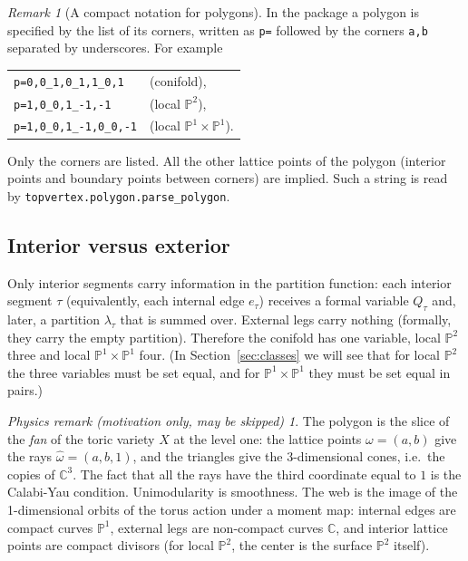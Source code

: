 \documentclass[11pt]{article}
\theoremstyle{plain}
\theoremstyle{definition}
\theoremstyle{remark}
\newtheorem{remark}[theorem]{Remark}
\newtheorem*{physrem}{Physics remark (motivation only, may be skipped)}
\newcommand{\C}{\mathbb{C}}
\newcommand{\PP}{\mathbb{P}}
\newcommand{\hatw}{\widehat{\omega}}
\begin{document}
\begin{remark}[A compact notation for polygons]\label{rem:corners}
In the package a polygon is specified by the list of its corners, written as \texttt{p=}
followed by the corners \texttt{a,b} separated by underscores. For example
\begin{center}
\begin{tabular}{ll}
\texttt{p=0,0\_1,0\_1,1\_0,1} & (conifold),\\
\texttt{p=1,0\_0,1\_-1,-1} & (local $\PP^2$),\\
\texttt{p=1,0\_0,1\_-1,0\_0,-1} & (local $\PP^1\times\PP^1$).
\end{tabular}
\end{center}
Only the corners are listed. All the other lattice points of the polygon (interior points and
boundary points between corners) are implied. Such a string is read by
\texttt{topvertex.polygon.parse\_polygon}.
\end{remark}

\subsection{Interior versus exterior}

Only interior segments carry information in the partition function: each interior segment
$\tau$ (equivalently, each internal edge $e_\tau$) receives a formal variable $Q_\tau$ and, later,
a partition $\lambda_\tau$ that is summed over. External legs carry nothing (formally, they carry
the empty partition). Therefore the conifold has one variable, local $\PP^2$ three and local
$\PP^1\times\PP^1$ four. (In Section~\ref{sec:classes} we will see that for local $\PP^2$ the
three variables must be set equal, and for $\PP^1\times\PP^1$ they must be set equal in pairs.)

\begin{physrem}
The polygon is the slice of the \textit{fan} of the toric variety $X$ at the level one: the
lattice points $\omega=(a,b)$ give the rays $\hatw=(a,b,1)$, and the triangles give the
3-dimensional cones, i.e.\ the copies of $\C^3$. The fact that all the rays have the third
coordinate equal to $1$ is the Calabi-Yau condition. Unimodularity is smoothness. The web is the
image of the 1-dimensional orbits
of the torus action under a moment map: internal edges are compact curves $\PP^1$, external
legs are non-compact curves $\C$, and interior lattice points are compact divisors (for
local $\PP^2$, the center is the surface $\PP^2$ itself).
\end{physrem}
\end{document}
